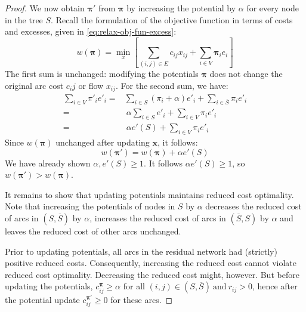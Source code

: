 \begin{proof}
We now obtain $\boldsymbol{\pi}'$ from $\boldsymbol{\pi}$ by increasing the potential by $\alpha$ for every node in the tree $S$. Recall the formulation of the objective function in terms of costs and excesses, given in \cref{eq:relax-obj-fun-excess}:
\[w\left(\boldsymbol{\pi}\right)=\min_{x}\left[\sum_{\left(i,j\right)\in E}c_{ij}x_{ij}+\sum_{i\in V}\boldsymbol{\pi}_{i}e_{i}\right]\]
The first sum is unchanged: modifying the potentials $\boldsymbol{\pi}$ does not change the original arc cost $c_ij$ or flow $x_{ij}$. For the second sum, we have:
\begin{align*}
\sum_{i\in V}\pi'_{i}e'_{i}= & \sum_{i\in S}\left(\pi_{i}+\alpha\right)e'_{i}+\sum_{i\in\overline{S}}\pi_{i}e'_{i}\\
= &\:\alpha\sum_{i\in S}e'_{i}+\sum_{i\in V}\pi_{i}e'_{i}\\
= &\:\alpha e'(S)+\sum_{i\in V}\pi_{i}e'_{i}
\end{align*}
Since $w\left(\boldsymbol{\pi}\right)$ unchanged after updating $\mathbf{x}$, it follows:
\[w\left(\boldsymbol{\pi}'\right)=w(\boldsymbol{\pi})+\alpha e'(S)\]
We have already shown $\alpha, e'(S) \geq 1$. It follows $\alpha e'(S) \geq 1$, so $w\left(\boldsymbol{\pi}'\right) > w\left(\boldsymbol{\pi}\right)$.

It remains to show that updating potentials maintains reduced cost optimality. Note that increasing the potentials of nodes in $S$ by $\alpha$ decreases the reduced cost of arcs in $\left(S,\overline{S}\right)$ by $\alpha$, increases the reduced cost of arcs in $\left(\overline{S},S\right)$ by $\alpha$ and leaves the reduced cost of other arcs unchanged.

Prior to updating potentials, all arcs in the residual network had (strictly) positive reduced costs. Consequently, increasing the reduced cost cannot violate reduced cost optimality\footnotemark.
 Decreasing the reduced cost might, however. But before updating the potentials, $c_{ij}^{\boldsymbol{\pi}} \geq \alpha$ for all $(i,j)\in\left(S,\overline{S}\right)\:\mbox{and}\:r_{ij}>0$, hence after the potential update $c_{ij}^{\boldsymbol{\pi}'}\geq 0$ for these arcs.
\end{proof}

